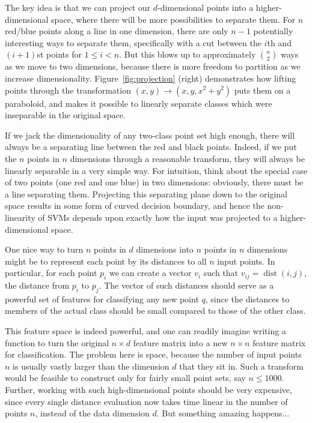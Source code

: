 \documentclass[10pt]{article}
\begin{document}
\begin{enumerate}
The key idea is that we can project our $d$-dimensional points into a higher-dimensional space, where there will be more possibilities to separate them. For $n$ red/blue points along a line in one dimension, there are only $n-1$ potentially interesting ways to separate them, specifically with a cut between the $i$th and $(i+1)$st points for $1 \leq i < n$. But this blows up to approximately $\binom{n}{2}$ ways as we move to two dimensions, because there is more freedom to partition as we increase dimensionality. Figure~\ref{fig:projection} (right) demonstrates how lifting points through the transformation $(x, y) \rightarrow (x, y, x^{2} + y^{2})$ puts them on a paraboloid, and makes it possible to linearly separate classes which were inseparable in the original space.

If we jack the dimensionality of any two-class point set high enough, there will always be a separating line between the red and black points. Indeed, if we put the $n$ points in $n$ dimensions through a reasonable transform, they will always be linearly separable in a very simple way. For intuition, think about the special case of two points (one red and one blue) in two dimensions: obviously, there must be a line separating them. Projecting this separating plane down to the original space results in some form of curved decision boundary, and hence the non-linearity of SVMs depends upon exactly how the input was projected to a higher-dimensional space.

One nice way to turn $n$ points in $d$ dimensions into $n$ points in $n$ dimensions might be to represent each point by its distances to all $n$ input points. In particular, for each point $p_{i}$ we can create a vector $v_{i}$ such that $v_{ij} = \operatorname{dist}(i, j)$, the distance from $p_{i}$ to $p_{j}$. The vector of such distances should serve as a powerful set of features for classifying any new point $q$, since the distances to members of the actual class should be small compared to those of the other class.

This feature space is indeed powerful, and one can readily imagine writing a function to turn the original $n \times d$ feature matrix into a new $n \times n$ feature matrix for classification. The problem here is space, because the number of input points $n$ is usually vastly larger than the dimension $d$ that they sit in. Such a transform would be feasible to construct only for fairly small point sets, say $n \leq 1000$. Further, working with such high-dimensional points should be very expensive, since every single distance evaluation now takes time linear in the number of points $n$, instead of the data dimension $d$. But something amazing happens...


\end{enumerate}
\end{document}
